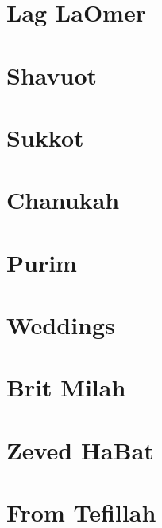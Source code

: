 \documentclass[letterpaper]{memoir}
\newcommand{\song}[2]{}
\begin{document}
\chapter{Lag LaOmer}
\song{V'amartem Ko Lachai}{Vamartem_Ko_Lachai.pdf}

\chapter{Shavuot}
\song{Roe' Ne'eman Hu}{Roe_Neeman_Hu.pdf}
\song{T'nu Kavod LaTorah}{Tnu_Kavod_LaTorah.pdf}

\chapter{Sukkot}
\song{Sukkah v'Lulav (Moroccan)}{Sukkah_vLulav_Moroccan.pdf}
\song{Sukkah v'Lulav (Yerushalmi)}{Sukkah_vLulav_Yerushalmi.pdf}
\song{Chanun Rachem}{Chanun_Rachem.pdf}
\song{Yah Et Sukkat David Takim}{Yah_Et_Sukkat_David_Takim.pdf}

\chapter{Chanukah}
\song{Yah Hatzel Yonah}{Yah_Hatzel_Yonah.pdf}
\song{Heichalo Heichalo}{Heichalo_Heichalo.pdf}
\song{L'neri}{Lneri.pdf}

\chapter{Purim}
\song{Ronu Gilu}{Ronu_Gilu.pdf}
\song{Or Gilah}{Or_Gilah.pdf} %
\song{El Melech Ne'eman}{El_Melech_Neeman.pdf}
\song{Ezer Mitzarai}{Ezer_Mitzarai.pdf}
\song{Simeni Rosh}{Simeni_Rosh.pdf}
\song{Chish Misgabi Geulah}{Chish_Misgabi_Geulah.pdf}
\song{Eli Tzur Yishuati}{Eli_Tzur_Yishuati.pdf}

\chapter{Weddings}
\song{Yismach Hatani}{Yismach_Hatani.pdf}
\song{El Me'od Na'alah}{El_Meod_Naalah.pdf}
\song{Im Chacham Libecha Beni}{Im_Chacham_Libecha_Beni.pdf}
\song{Makhelot Am}{Makhelot_Am.pdf}
\song{Ya'alah Ya'alah (Yerushalmi)}{Yaalah_Yaalah_Yerushalmi.pdf}
\song{Ya'alah Ya'alah (Syrian)}{Yaalah_Yaalah_Syrian.pdf}
\song{Et Dodim Kalah}{Et_Dodim_Kalah.pdf}

\chapter{Brit Milah}
\song{Mah Tov Mah Na'im}{Mah_Tov_Mah_Naim.pdf}
\song{Yehi Shalom b'Cheleinu (Yerushalmi)}{Yehi_Shalom_bCheleinu_Yerushalmi.pdf}
\song{Yehi Shalom B'Cheleinu (Syrian)}{Yehi_Shalom_bCheleinu_Syrian.pdf}

\chapter{Zeved HaBat}
\song{Nava Yafa Tz'viyah}{Nava_Yafa_Tzviyah.pdf}

\chapter{From Tefillah}
\song{Azharot}{Azharot.pdf}
\song{Halleluyah Tehillim 150}{Halleluyah_Tehillim_150.pdf}
\song{Pitchu Li}{Pitchu_Li.pdf}
\end{document}
